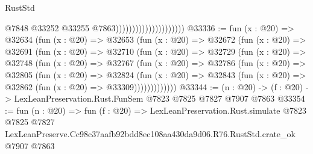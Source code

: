 \begin{lexlean}{RustStd}
\begin{coremodule}
                                              @7848
                                              @33252
                                              @33255
                                              @7863)))))))))))))))))))))
@33336 := fun (x : @20) =>
  @32634
    (fun (x : @20) =>
    @32653
      (fun (x : @20) =>
      @32672
        (fun (x : @20) =>
        @32691
          (fun (x : @20) =>
          @32710
            (fun (x : @20) =>
            @32729
              (fun (x : @20) =>
              @32748
                (fun (x : @20) =>
                @32767
                  (fun (x : @20) =>
                  @32786
                    (fun (x : @20) =>
                    @32805
                      (fun (x : @20) =>
                      @32824
                        (fun (x : @20) =>
                        @32843 (fun (x : @20) => @32862 (fun (x : @20) => @33309)))))))))))))
@33344 := (n : @20) -> (f : @20) -> LexLeanPreservation.Rust.FunSem @7823 @7825 @7827 @7907 @7863
@33354 := fun (n : @20) =>
  fun (f : @20) =>
  LexLeanPreservation.Rust.simulate
    @7823
    @7825
    @7827
    LexLeanPreserve.Cc98c37aafb92bdd8ec108aa430da9d06.R76.RustStd.crate_ok
    @7907
    @7863
\end{coremodule}
\end{lexlean}

